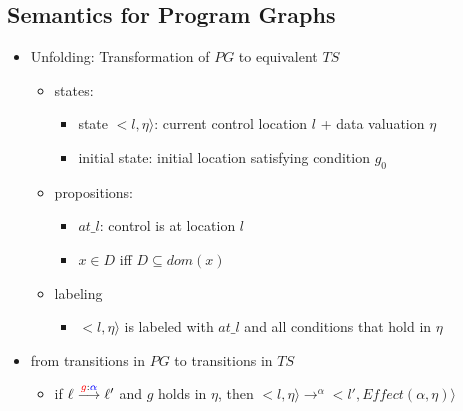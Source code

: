 \documentclass[a4paper, 10pt]{article}
\begin{document}
\subsection*{Semantics for Program Graphs}
\begin{itemize}
    \item Unfolding: Transformation of $PG$ to equivalent $TS$
    \begin{itemize}
        \item states:
        \begin{itemize}
            \item state $<l,\eta\rangle$: current control location $l$ + data valuation $\eta$
            \item initial state: initial location satisfying condition $g_0$
        \end{itemize}
        \item propositions:
        \begin{itemize}
            \item $at\_l$: control is at location $l$
            \item $x\in D$ iff $D\subseteq dom(x)$
        \end{itemize}
        \item labeling
        \begin{itemize}
            \item $<l,\eta\rangle$ is labeled with $at\_l$ and all conditions that hold in $\eta$
        \end{itemize}
    \end{itemize}
    \item from transitions in $PG$ to transitions in $TS$
    \begin{itemize}
        \item if $\ell\overset{\textcolor{red}{g}:\textcolor{blue}{\alpha}}{\longrightarrow} \ell'$ and $g$ holds in $\eta$, then $<l,\eta\rangle\to^\alpha<l',Effect(\alpha,\eta)\rangle$
    \end{itemize}
\end{itemize}
\end{document}
